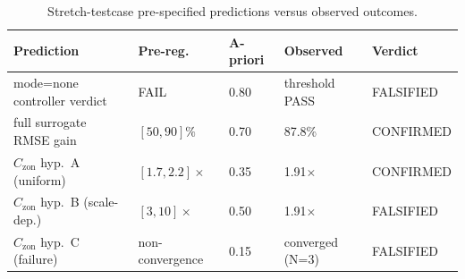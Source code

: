 \documentclass[11pt,a4paper]{article}
\begin{document}
\begin{table}[H]
\centering
\small
\caption{Stretch-testcase pre-specified predictions versus observed outcomes.}
\label{tab:predictions}
\begin{tabularx}{\linewidth}{>{\raggedright\arraybackslash}X l l l l}
\toprule
Prediction & Pre-reg.\ & A-priori & Observed & Verdict \\
\midrule
mode=none controller verdict & FAIL & 0.80 & threshold PASS & FALSIFIED \\
full surrogate RMSE gain & $[50,90]\%$ & 0.70 & 87.8\% & CONFIRMED \\
$C_{\mathrm{zon}}$ hyp.\ A (uniform) & $[1.7,2.2]\times$ & 0.35 & 1.91$\times$ & CONFIRMED \\
$C_{\mathrm{zon}}$ hyp.\ B (scale-dep.) & $[3,10]\times$ & 0.50 & 1.91$\times$ & FALSIFIED \\
$C_{\mathrm{zon}}$ hyp.\ C (failure) & non-convergence & 0.15 & converged (N=3) & FALSIFIED \\
\bottomrule
\end{tabularx}
\end{table}
\end{document}
